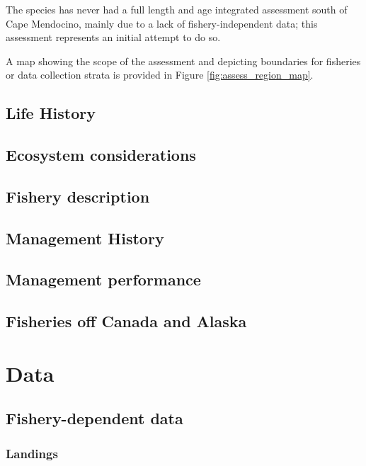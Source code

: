\documentclass[
]{scrartcl}
\begin{document}
The species has never had a full length and age integrated assessment
south of Cape Mendocino, mainly due to a lack of fishery-independent
data; this assessment represents an initial attempt to do so.

A map showing the scope of the assessment and depicting boundaries for
fisheries or data collection strata is provided in Figure
\ref{fig:assess_region_map}.

\subsection{Life History}\label{life-history}

\subsection{Ecosystem considerations}\label{ecosystem-considerations-1}

\subsection{Fishery description}\label{fishery-description}

\subsection{Management History}\label{management-history}

\subsection{Management performance}\label{management-performance-1}

\subsection{Fisheries off Canada and
Alaska}\label{fisheries-off-canada-and-alaska}

\newpage{}

\section{Data}\label{data}

\subsection{Fishery-dependent data}\label{fishery-dependent-data}

\subsubsection{Landings}\label{landings}
\end{document}

